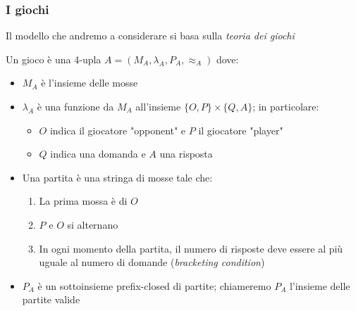 \documentclass{beamer}
\begin{document}
\begin{frame}
	\frametitle{I giochi}
	
	Il modello che andremo a considerare si basa sulla \emph{teoria dei giochi}
	
	
	Un gioco è una 4-upla $A=( M_A , \lambda_A , P_A , \approx_A )$ dove:
	\begin{itemize}
	\item $M_A$ è l'insieme delle mosse
	\item $\lambda_A$ è una funzione da $M_A$ all'insieme $\{ O,P\} \times \{Q,A\}$; in particolare:
		\begin{itemize}
		\item $O$ indica il giocatore "opponent" e $P$ il giocatore "player"
		\item $Q$ indica una domanda e $A$ una risposta
		\end{itemize}
	\item Una partita è una stringa di mosse tale che:
		\begin{enumerate}
		\item La prima mossa è di $O$
		\item $P$ e $O$ si alternano
		\item In ogni momento della partita, il numero di risposte deve essere al più uguale al numero di domande (\emph{bracketing condition})
		\end{enumerate}
	\item $P_A$ è un sottoinsieme prefix-closed di partite; chiameremo $P_A$ l'insieme delle partite valide
	\end{itemize}
	
	
\end{frame}
\end{document}
